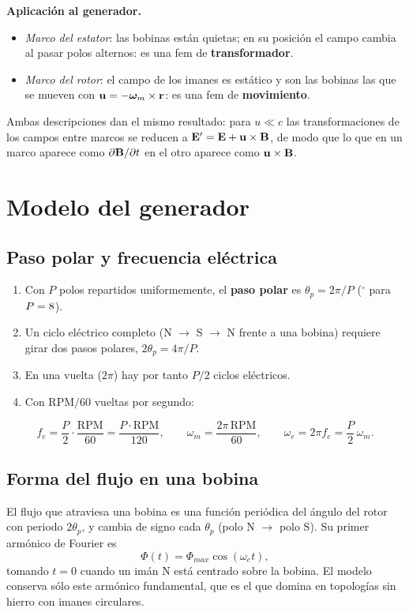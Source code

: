 \documentclass[11pt]{article}
\begin{document}
\textbf{Aplicación al generador.}
\begin{itemize}
  \item \emph{Marco del estator}: las bobinas están quietas; en su posición el campo cambia al pasar polos
        alternos: es una fem de \textbf{transformador}.
  \item \emph{Marco del rotor}: el campo de los imanes es estático y son las bobinas las que se mueven con
        $\mathbf{u}=-\bm{\omega}_m\times\mathbf{r}$: es una fem de \textbf{movimiento}.
\end{itemize}
Ambas descripciones dan el mismo resultado: para $u\ll c$ las transformaciones de los campos entre marcos se
reducen a $\mathbf{E}'=\mathbf{E}+\mathbf{u}\times\mathbf{B}$, de modo que lo que en un marco aparece como
$\partial\mathbf{B}/\partial t$ en el otro aparece como $\mathbf{u}\times\mathbf{B}$.

\section{Modelo del generador}

\subsection{Paso polar y frecuencia eléctrica}
\begin{enumerate}
  \item Con $P$ polos repartidos uniformemente, el \textbf{paso polar} es $\theta_p=2\pi/P$
        (\ValPasoPolarGrados$^\circ$ para $P=8$).
  \item Un ciclo eléctrico completo (N $\to$ S $\to$ N frente a una bobina) requiere girar dos pasos polares,
        $2\theta_p=4\pi/P$.
  \item En una vuelta ($2\pi$) hay por tanto $P/2$ ciclos eléctricos.
  \item Con $\text{RPM}/60$ vueltas por segundo:
\end{enumerate}
\begin{equation}
  f_e=\frac{P}{2}\cdot\frac{\text{RPM}}{60}=\frac{P\cdot\text{RPM}}{120},\qquad
  \omega_m=\frac{2\pi\,\text{RPM}}{60},\qquad \omega_e=2\pi f_e=\frac{P}{2}\,\omega_m .
  \label{eq:frecuencia}
\end{equation}

\subsection{Forma del flujo en una bobina}
El flujo que atraviesa una bobina es una función periódica del ángulo del rotor con periodo $2\theta_p$, y
cambia de signo cada $\theta_p$ (polo N $\to$ polo S). Su primer armónico de Fourier es
\begin{equation}
  \Phi(t)=\Phi_{max}\cos(\omega_e t),
\end{equation}
tomando $t=0$ cuando un imán N está centrado sobre la bobina. El modelo conserva sólo este armónico
fundamental, que es el que domina en topologías sin hierro con imanes circulares.
\end{document}
